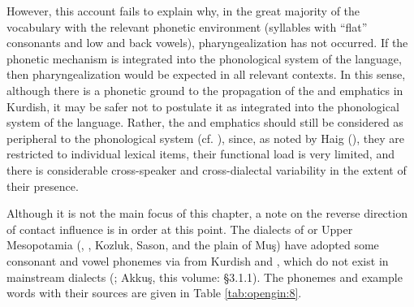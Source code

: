 \documentclass[output=paper]{langsci/langscibook}
\begin{document}
However, this account fails to explain why, in the great majority of the vocabulary with the relevant phonetic environment (syllables with “flat” consonants and low and back vowels), pharyngealization has not occurred. If the phonetic mechanism is integrated into the phonological system of the language, then pharyngealization would be expected in all relevant contexts. In this sense, although there is a phonetic ground to the propagation of the  and emphatics in Kurdish, it may be safer not to postulate it as integrated into the phonological system of the language. Rather, the  and emphatics should still be considered as peripheral to the phonological system (cf. \citealt{Haig2007,Anonbyforthcoming}), since, as noted by Haig (\citeyear[167]{Haig2007}), they are restricted to individual lexical items, their functional load is very limited, and there is considerable cross-speaker and cross-dialectal variability in the extent of their presence. 

Although it is not the main focus of this chapter, a note on the reverse direction of contact influence is in order at this point. The  dialects of  or Upper Mesopotamia (, , Kozluk, Sason, and the plain of Muş) have adopted some consonant and vowel phonemes via  from Kurdish and , which do not exist in mainstream  dialects (\citealt[84]{Jastrow2011Kurdish}; Akkuş, this volume: §3.1.1). The phonemes and example words with their sources are given in Table \ref{tab:opengin:8}.
\end{document}
